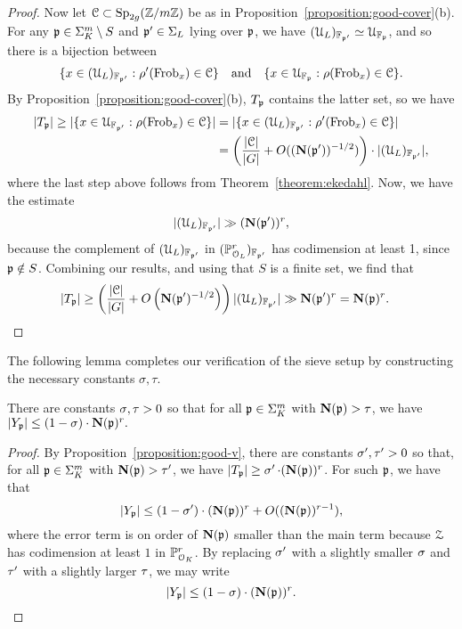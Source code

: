 \begin{proof}
	Now let $\mathcal C \subset \operatorname{Sp}_{2g}({\mathbb Z} / m {\mathbb Z})$ be as in Proposition~\ref{proposition:good-cover}(b). For any $\mathfrak{p} \in \Sigma^m_K \setminus S$
	and $\mathfrak p' \in \Sigma_{L}$ lying over $\mathfrak p$, we have
$(\mathcal{U}_{L})_{\mathbb F_{\mathfrak p'}} \simeq \mathcal{U}_{\mathbb F_\mathfrak p}$, and so there
is a bijection between
	\begin{align*}
		\{x \in (\mathcal{U}_{L})_{\mathbb F_{\mathfrak p'}} : \rho'(\operatorname{Frob}_x) \in \mathcal C\}
		\quad \text{and} \quad \{x \in \mathcal{U}_{\mathbb F_{\mathfrak p}} : \rho(\operatorname{Frob}_x) \in \mathcal C\}.
	\end{align*}
	By Proposition~\ref{proposition:good-cover}(b), $T_{\mathfrak{p}}$ contains the latter set, so we have
	\begin{align*}
		|T_{\mathfrak{p}}| \ge |\{x \in \mathcal{U}_{\mathbb F_{\mathfrak p'}} : \rho(\operatorname{Frob}_x) \in \mathcal C\}| &= |\{x \in (\mathcal{U}_{L})_{\mathbb F_{\mathfrak p'}} : \rho'(\operatorname{Frob}_x) \in \mathcal C\}| \\
		&= \left( \frac{|\mathcal C|}{|G|} + O((\mathbf{N}(\mathfrak{p}'))^{-1/2}) \right) \cdot |(\mathcal{U}_{L})_{\mathbb F_{\mathfrak p'}}|,
	\end{align*}
	where the last step above follows from Theorem~\ref{theorem:ekedahl}. Now, we have the estimate
    \[
		|(\mathcal{U}_{L})_{\mathbb F_{\mathfrak{p}'}}| \gg (\mathbf{N}(\mathfrak{p}'))^r,
	\]
	because the complement of $(\mathcal{U}_{L})_{\mathbb F_{\mathfrak p'}}$ in $({\mathbb P}^r_{\mathcal{O}_{L}})_{\mathbb F_{\mathfrak p'}}$ has codimension at least 1, since $\mathfrak p \notin S$. Combining our results, and using that $S$ is a finite set, we find that
	\begin{align*}
		|T_\mathfrak p| \geq \left( \frac{|\mathcal C|}{|G|} + O\left(\mathbf{N}(\mathfrak{p}')^{-1/2}\right) \right) |(\mathcal{U}_{L})_{\mathbb F_{\mathfrak p'}}| &\gg \mathbf{N}(\mathfrak{p}')^r = \mathbf{N}(\mathfrak{p})^r. \qedhere
	\end{align*}
\end{proof}

The following lemma completes our verification of the sieve setup by constructing the necessary constants $\sigma, \tau$.

\begin{lemma}
	\label{lemma:bounding-Y-reduction}
	There are constants $\operatorname{\sigma},\operatorname{\tau} > 0$ so that for all $\mathfrak p \in \Sigma^m_K$ with $\mathbf{N}(\mathfrak p) > \tau$, we have
	$|Y_\mathfrak p| \leq \left( 1-\operatorname{\sigma} \right) \cdot \mathbf{N} (\mathfrak p)^r.$
\end{lemma}
\begin{proof}
By Proposition~\ref{proposition:good-v}, there are constants $\operatorname{\sigma}', \operatorname{\tau}' > 0$ so that, for all $\mathfrak p \in \Sigma^m_K$ with $\mathbf{N}(\mathfrak p) > \operatorname{\tau}'$,
we have $|T_{\mathfrak{p}}| \geq \operatorname{\sigma}' \cdot(\mathbf{N}(\mathfrak p))^r$.
For such $\mathfrak{p}$, we have that
\[
	|Y_{\mathfrak{p}}| \le (1 - \operatorname{\sigma}') \cdot (\mathbf{N}(\mathfrak{p}))^r + O((\mathbf{N}(\mathfrak{p}))^{r-1}),
\]
where the error term is on order of $\mathbf{N}(\mathfrak p)$ smaller than the main term because $\mathcal{Z}$ has codimension at least $1$ in ${\mathbb P}^r_{\mathcal{O}_K}$. By replacing $\operatorname{\sigma}'$ with a slightly smaller $\operatorname{\sigma}$ and $\operatorname{\tau}'$ with a slightly larger $\operatorname{\tau}$, we may write
\[
	|Y_{\mf{p}}| \le (1 - \galSlope) \cdot (\N(\mf{p}))^r. \hfill \qedhere
\]
\end{proof}

